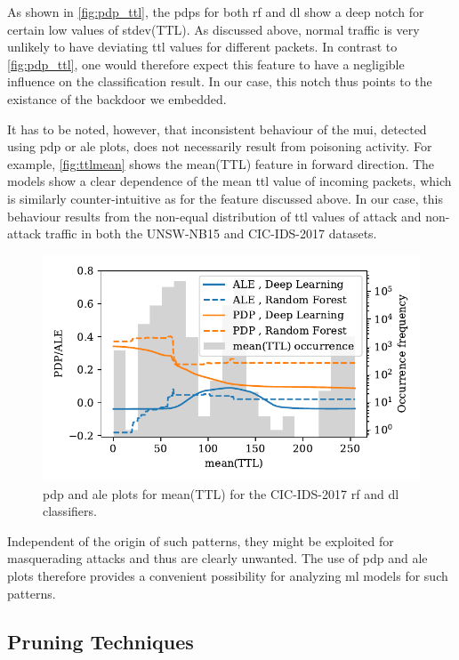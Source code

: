 \documentclass[10pt,sigconf,letterpaper,dvipsnames]{acmart}
\begin{document}
As shown in \autoref{fig:pdp_ttl}, the \glspl{pdp} for both \gls{rf} and \gls{dl} show a deep notch for certain low values of stdev(TTL). As discussed above, normal traffic is very unlikely to have deviating \gls{ttl} values for different packets. In contrast to \autoref{fig:pdp_ttl}, one would therefore expect this feature to have a negligible influence on the classification result. In our case, this notch thus points to the existance of the backdoor we embedded.


It has to be noted, however, that inconsistent behaviour of the \gls{mui}, detected using \gls{pdp} or \gls{ale} plots, does not necessarily result from poisoning activity.  For example, \autoref{fig:ttlmean} shows the mean(TTL) feature in forward direction. The models show a clear dependence of the mean \gls{ttl} value of incoming packets, which is similarly counter-intuitive as for the feature discussed above. In our case, this behaviour results from the non-equal distribution of \gls{ttl} values of attack and non-attack traffic in both the UNSW-NB15 and CIC-IDS-2017 datasets. 

\begin{figure}[b]
\includegraphics[width=\columnwidth]{figures/ttlmean.pdf}
\caption{\gls{pdp} and \gls{ale} plots for mean(TTL) for the CIC-IDS-2017 \gls{rf} and \gls{dl} classifiers.}
\label{fig:ttlmean}
\end{figure}
Independent of the origin of such patterns, they might be exploited for masquerading attacks and thus are clearly unwanted. The use of \gls{pdp} and \gls{ale} plots therefore provides a convenient possibility for analyzing \gls{ml} models for such patterns.
\subsection{Pruning Techniques}
\end{document}
